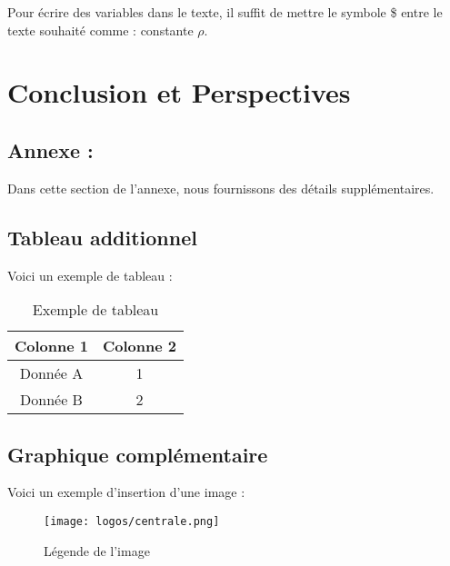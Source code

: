 \documentclass{rapportECC}
\begin{document}
Pour écrire des variables dans le texte, il suffit de mettre le symbole \$ entre le texte souhaité comme : constante $\rho$. \cite{Companion}


\section{Conclusion et Perspectives}
\lipsum[1-2] \cite{matsumoto_tracking_2013}

\newpage


\printbibliography

\newpage
\begin{appendices}
\section{Annexe : }
Dans cette section de l'annexe, nous fournissons des détails supplémentaires.

\subsection{Tableau additionnel}
Voici un exemple de tableau :
\begin{table}[h]
    \centering
    \begin{tabular}{|c|c|}
    \hline
    Colonne 1 & Colonne 2 \\
    \hline
    Donnée A & 1 \\
    Donnée B & 2 \\
    \hline
    \end{tabular}
    \caption{Exemple de tableau}
\end{table}

\subsection{Graphique complémentaire}
Voici un exemple d'insertion d'une image :
\begin{figure}[h]
    \centering
    \texttt{[image: logos/centrale.png]}
    \caption{Légende de l'image}
\end{figure}
\end{appendices}
\end{document}
